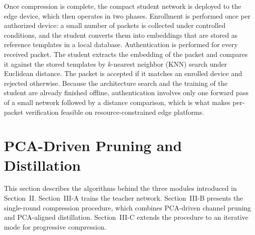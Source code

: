\documentclass[journal,comsoc]{IEEEtran}
\begin{document}
Once compression is complete, the compact student network is deployed to the edge device, which then operates in two phases. Enrollment is performed once per authorized device: a small number of packets is collected under controlled conditions, and the student converts them into embeddings that are stored as reference templates in a local database. Authentication is performed for every received packet. The student extracts the embedding of the packet and compares it against the stored templates by $k$-nearest neighbor (KNN) search under Euclidean distance. The packet is accepted if it matches an enrolled device and rejected otherwise. Because the architecture search and the training of the student are already finished offline, authentication involves only one forward pass of a small network followed by a distance comparison, which is what makes per-packet verification feasible on resource-constrained edge platforms.

\section{PCA-Driven Pruning and Distillation}

This section describes the algorithms behind the three modules introduced in Section~II. Section~III-A trains the teacher network. Section~III-B presents the single-round compression procedure, which combines PCA-driven channel pruning and PCA-aligned distillation. Section~III-C extends the procedure to an iterative mode for progressive compression.
\end{document}
